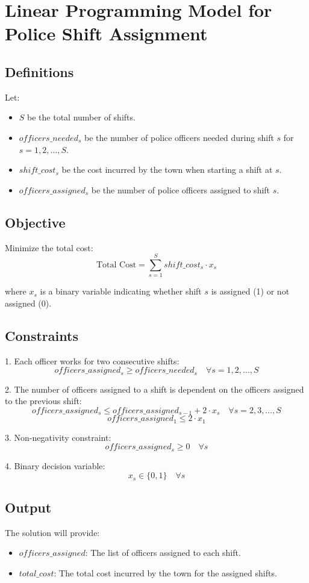 \documentclass{article}
\begin{document}
\section*{Linear Programming Model for Police Shift Assignment}

\subsection*{Definitions}
Let:
\begin{itemize}
    \item \( S \) be the total number of shifts.
    \item \( officers\_needed_{s} \) be the number of police officers needed during shift \( s \) for \( s = 1, 2, \ldots, S \).
    \item \( shift\_cost_{s} \) be the cost incurred by the town when starting a shift at \( s \).
    \item \( officers\_assigned_{s} \) be the number of police officers assigned to shift \( s \).
\end{itemize}

\subsection*{Objective}
Minimize the total cost:
\[
\text{Total Cost} = \sum_{s=1}^{S} shift\_cost_{s} \cdot x_{s}
\]

where \( x_{s} \) is a binary variable indicating whether shift \( s \) is assigned (1) or not assigned (0).

\subsection*{Constraints}
1. Each officer works for two consecutive shifts:
   \[
   officers\_assigned_{s} \geq officers\_needed_{s} \quad \forall s = 1, 2, \ldots, S
   \]

2. The number of officers assigned to a shift is dependent on the officers assigned to the previous shift:
   \[
   officers\_assigned_{s} \leq officers\_assigned_{s-1} + 2 \cdot x_{s} \quad \forall s = 2, 3, \ldots, S
   \]
   \[
   officers\_assigned_{1} \leq 2 \cdot x_{1} 
   \]

3. Non-negativity constraint:
   \[
   officers\_assigned_{s} \geq 0 \quad \forall s
   \]

4. Binary decision variable:
   \[
   x_{s} \in \{0, 1\} \quad \forall s
   \]

\subsection*{Output}
The solution will provide:
\begin{itemize}
    \item \( officers\_assigned \): The list of officers assigned to each shift.
    \item \( total\_cost \): The total cost incurred by the town for the assigned shifts.
\end{itemize}
\end{document}
